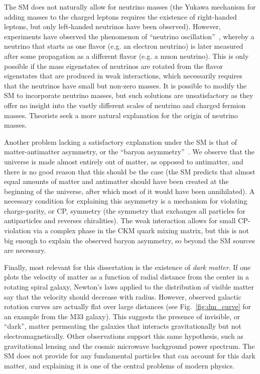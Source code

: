The SM does not naturally allow for neutrino masses (the Yukawa mechanism for adding masses to the charged leptons
requires the existence of right-handed leptons, but only left-handed neutrinos have been observed). However,
experiments have observed the phenomenon of ``neutrino oscillation''~\cite{PDGreview14}, whereby a neutrino that
starts as one flavor (e.g. an electron neutrino) is later measured after some propagation as a different flavor
(e.g. a muon neutrino). This is only possible if the mass eigenstates of neutrinos are rotated from the flavor
eigenstates that are produced in weak interactions, which necessarily requires that the neutrinos have small
but non-zero masses. It is possible to modify the SM to incorporate neutrino masses, but such solutions are
unsatisfactory as they offer no insight into the vastly different scales of neutrino and charged fermion masses.
Theorists seek a more natural explanation for the origin of neutrino masses.

Another problem lacking a satisfactory explanation under the SM is that of matter-antimatter asymmetry, 
or the ``baryon asymmetry''~\cite{Canetti:baryon_asymm}. 
We observe that the universe is made almost entirely out of matter, as opposed
to antimatter, and there is no good reason that this should be the case (the SM predicts that almost equal amounts
of matter and antimatter should have been created at the beginning of the universe, after which most of it
would have been annihilated). A necessary condition for explaining this asymmetry is a mechanism for violating
charge-parity, or CP, symmetry (the symmetry that exchanges all particles for antiparticles and reverses chiralities).
The weak interaction allows for small CP-violation via a complex phase in the CKM quark mixing matrix, but this
is not big enough to explain the observed baryon asymmetry, so beyond the SM sources are necessary.

Finally, most relevant for this dissertation is the existence of \textit{dark matter}. If one plots the velocity of
matter as a function of radial distance from the center in a rotating spiral galaxy, Newton's laws
applied to the distribution of visible matter say that the velocity should decrease with radius. However, observed 
galactic rotation curves are actually flat over large distances (see Fig.~\ref{fig:dm_curve} for an example from the M33
galaxy). This suggests the presence of invisible, or ``dark'', matter permeating the galaxies that interacts
gravitationally but not electromagnetically. Other observations support this same hypothesis, such as gravitational
lensing and the cosmic microwave background power spectrum. The SM does not provide for any fundamental particles
that can account for this dark matter, and explaining it is one of the central problems of modern physics.

